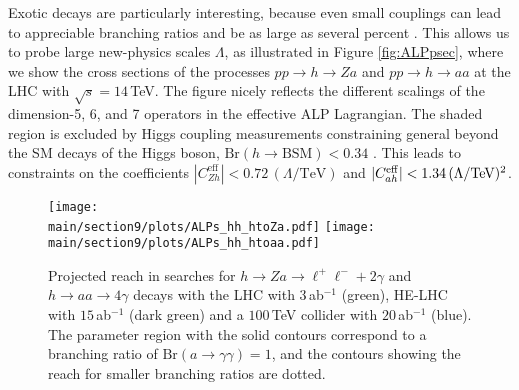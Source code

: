 Exotic decays are particularly interesting, because even small couplings can lead to appreciable branching ratios and be as large as several percent \cite{Bauer:2017nlg, Bauer:2017ris}. 
This allows us to probe large new-physics scales $\Lambda$, as illustrated in Figure \ref{fig:ALPpsec}, where we show the cross sections of the processes $pp \to h \to Z a$ and $pp \to h \to aa$  at the LHC with $\sqrt{s} = 14\,$TeV. The figure nicely reflects the different scalings of the dimension-5, 6, and 7 operators in the effective ALP Lagrangian. The 
shaded region is excluded by Higgs coupling measurements constraining general beyond the SM decays of the Higgs boson, $\text{Br}(h\to\text{BSM})<0.34$ 
\cite{Khachatryan:2016vau}. This leads to constraints on the coefficients $|C_{Zh}^{\textrm{eff}}| < 0.72\,(\Lambda/\textrm{TeV})$ and $|C_{ah}^{\rm eff}| < 1.34\,(\Lambda/\textrm{TeV})^2$. 


%
\begin{figure}[t]
\begin{center}
\texttt{[image: \\main/section9/plots/ALPs\_hh\_htoZa.pdf]}
\texttt{[image: \\main/section9/plots/ALPs\_hh\_htoaa.pdf]}
\end{center}
\vspace{-0mm}
\caption{\label{fig:pphZa} Projected reach in searches for $h \to Za \to \ell^+\ell^-+2\gamma $ and $h \to aa \to 4\gamma $ decays with the LHC with $3$\,ab$^{-1}$
(green), HE-LHC with $15$\,ab$^{-1}$ (dark green) and a $100\,$TeV collider with $20$\,ab$^{-1}$ (blue). The parameter region with the solid contours correspond to a branching ratio of $\text{Br}(a\to 
\gamma\gamma)=1$, and the contours showing the reach for smaller branching ratios are dotted.}
\end{figure}
%


